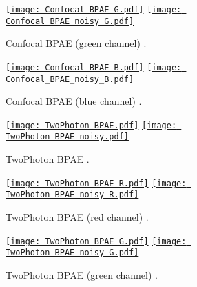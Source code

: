 \documentclass{report}%
\begin{document}
\begin{appendix}
\begin{figure}[h]
  \centering
  \href{https://nbviewer.org/github/vicente-gonzalez-ruiz/denoising/blob/main/notebooks/Confocal_BPAE.ipynb}{\texttt{[image: Confocal\_BPAE\_G.pdf]}}
  \href{https://nbviewer.org/github/vicente-gonzalez-ruiz/denoising/blob/main/notebooks/Confocal_BPAE.ipynb}{\texttt{[image: Confocal\_BPAE\_noisy\_G.pdf]}}
  \caption{Confocal BPAE (green channel) \cite{zhang2019poisson}.\label{fig:Confocal_BPAE_G}}
\end{figure}

\begin{figure}[h]
  \centering
  \href{https://nbviewer.org/github/vicente-gonzalez-ruiz/denoising/blob/main/notebooks/Confocal_BPAE.ipynb}{\texttt{[image: Confocal\_BPAE\_B.pdf]}}
  \href{https://nbviewer.org/github/vicente-gonzalez-ruiz/denoising/blob/main/notebooks/Confocal_BPAE.ipynb}{\texttt{[image: Confocal\_BPAE\_noisy\_B.pdf]}}
  \caption{Confocal BPAE (blue channel) \cite{zhang2019poisson}.\label{fig:Confocal_BPAE_B}}
\end{figure}

\begin{figure}[h]
  \centering
  \href{https://nbviewer.org/github/vicente-gonzalez-ruiz/denoising/blob/main/notebooks/TwoPhoton_BPAE.ipynb}{\texttt{[image: TwoPhoton\_BPAE.pdf]}}
  \href{https://nbviewer.org/github/vicente-gonzalez-ruiz/denoising/blob/main/notebooks/TwoPhoton_BPAE.ipynb}{\texttt{[image: TwoPhoton\_BPAE\_noisy.pdf]}}
  \caption{TwoPhoton BPAE \cite{zhang2019poisson}.\label{fig:TwoPhoton_BPAE}}
\end{figure}

\begin{figure}[h]
  \centering
  \href{https://nbviewer.org/github/vicente-gonzalez-ruiz/denoising/blob/main/notebooks/TwoPhoton_BPAE.ipynb}{\texttt{[image: TwoPhoton\_BPAE\_R.pdf]}}
  \href{https://nbviewer.org/github/vicente-gonzalez-ruiz/denoising/blob/main/notebooks/TwoPhoton_BPAE.ipynb}{\texttt{[image: TwoPhoton\_BPAE\_noisy\_R.pdf]}}
  \caption{TwoPhoton BPAE (red channel) \cite{zhang2019poisson}.\label{fig:TwoPhoton_BPAE_R}}
\end{figure}

\begin{figure}[h]
  \centering
  \href{https://nbviewer.org/github/vicente-gonzalez-ruiz/denoising/blob/main/notebooks/TwoPhoton_BPAE.ipynb}{\texttt{[image: TwoPhoton\_BPAE\_G.pdf]}}
  \href{https://nbviewer.org/github/vicente-gonzalez-ruiz/denoising/blob/main/notebooks/TwoPhoton_BPAE.ipynb}{\texttt{[image: TwoPhoton\_BPAE\_noisy\_G.pdf]}}
  \caption{TwoPhoton BPAE (green channel) \cite{zhang2019poisson}.\label{fig:TwoPhoton_BPAE_G}}
\end{figure}


\end{appendix}
\end{document}
